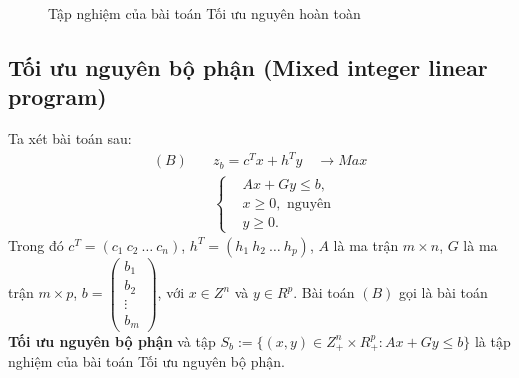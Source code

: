 \documentclass[12pt,a4paper]{report}
\begin{document}
\begin{figure}
\center
	
\caption{Tập nghiệm của bài toán Tối ưu nguyên hoàn toàn}
\end{figure}

\subsection*{Tối ưu nguyên bộ phận (Mixed integer linear program)}
Ta xét bài toán sau:
\begin{equation}\label{B}
\begin{split}
(B) \quad & z_b=c^Tx+h^Ty \quad \longrightarrow Max \\
          & \left\{\begin{split}
            &Ax+Gy \leq  b, \\
            &x \geq 0, \text{ nguyên} \\
            &y \geq 0.
            \end{split}\right.    
\end{split}
\end{equation}    
Trong đó $c^T=(c_1 \: c_2 \: \ldots \: c_n)$, $h^T=(h_1 \: h_2 \: \ldots \: h_p)$, $A$ là ma trận $m\times n$, $G$ là ma trận $m\times p$, $b=\begin{pmatrix}
    b_1 \\
    b_2 \\
    \vdots \\
    b_m
    \end{pmatrix}$, với $x\in Z^n$ và $y\in R^p$.
Bài toán $(B)$ gọi là bài toán \textbf{Tối ưu nguyên bộ phận} và tập $S_b:=\{(x,y)\in Z^n_+\times R^p_+: Ax+Gy\leq b\}$ là tập nghiệm của bài toán Tối ưu nguyên bộ phận.
\end{document}
